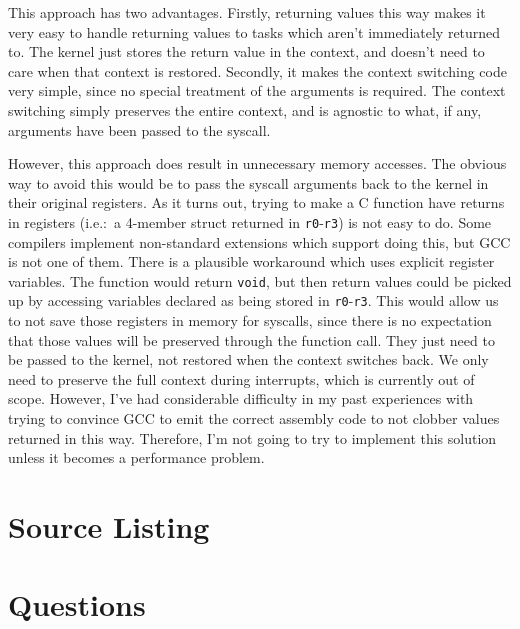 \documentclass{article}
\begin{document}
This approach has two advantages.
Firstly, returning values this way makes it very easy to handle returning values
to tasks which aren't immediately returned to.
The kernel just stores the return value in the context, and doesn't need to care
when that context is restored.
Secondly, it makes the context switching code very simple, since no special treatment
of the arguments is required.
The context switching simply preserves the entire context, and is agnostic to what,
if any, arguments have been passed to the syscall.

However, this approach does result in unnecessary memory accesses.
The obvious way to avoid this would be to pass the syscall arguments back to the kernel
in their original registers.
As it turns out, trying to make a C function have returns in registers (i.e.:\ a 4-member
struct returned in \texttt{r0}-\texttt{r3}) is not easy to do.
Some compilers implement non-standard extensions which support doing this, but GCC
is not one of them.
There is a plausible workaround which uses explicit register variables.
The function would return \texttt{void}, but then return values could be picked up
by accessing variables declared as being stored in \texttt{r0}-\texttt{r3}.
This would allow us to not save those registers in memory for syscalls, since
there is no expectation that those values will be preserved through the function call.
They just need to be passed to the kernel, not restored when the context switches back.
We only need to preserve the full context during interrupts, which is
currently out of scope.
However, I've had considerable difficulty in my past experiences with trying to
convince GCC to emit the correct assembly code to not clobber values returned in this
way.
Therefore, I'm not going to try to implement this solution unless it becomes a
performance problem.

\section{Source Listing}
\section{Questions}
\end{document}
